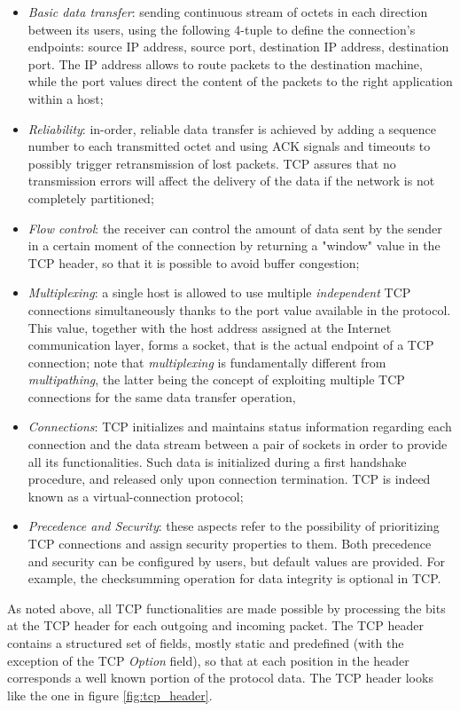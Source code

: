 \begin{itemize}
  \item \textit{Basic data transfer}: sending continuous stream of octets in each direction between its users, using the following 4-tuple to define the connection's endpoints: source IP address, source port, destination IP address, destination port. The IP address allows to route packets to the destination machine, while the port values direct the content of the packets to the right application within a host;
  \item \textit{Reliability}: in-order, reliable data transfer is achieved by adding a sequence number to each transmitted octet and using ACK signals and timeouts to possibly trigger retransmission of lost packets. TCP assures that no transmission errors will affect the delivery of the data if the network is not completely partitioned;
  \item \textit{Flow control}: the receiver can control the amount of data sent by the sender in a certain moment of the connection by returning a "window" value in the TCP header, so that it is possible to avoid buffer congestion;
  \item \textit{Multiplexing}: a single host is allowed to use multiple \textit{independent} TCP connections simultaneously thanks to the port value available in the protocol. This value, together with the host address assigned at the Internet communication layer, forms a socket, that is the actual endpoint of a TCP connection; note that \textit{multiplexing} is fundamentally different from \textit{multipathing}, the latter being the concept of exploiting multiple TCP connections for the same data transfer operation,
  \item \textit{Connections}: TCP initializes and maintains status information regarding each connection and the data stream between a pair of sockets in order to provide all its functionalities. Such data is initialized during a first handshake procedure, and released only upon connection termination. TCP is indeed known as a virtual-connection protocol;
  \item \textit{Precedence and Security}: these aspects refer to the possibility of prioritizing TCP connections and assign security properties to them. Both precedence and security can be configured by users, but default values are provided. For example, the checksumming operation for data integrity is optional in TCP.
\end{itemize}

As noted above, all TCP functionalities are made possible by processing the bits at the TCP header for each outgoing and incoming packet. The TCP header contains a structured set of fields, mostly static and predefined (with the exception of the TCP \textit{Option} field), so that at each position in the header corresponds a well known portion of the protocol data. The TCP header looks like the one in figure \ref{fig:tcp_header}.

